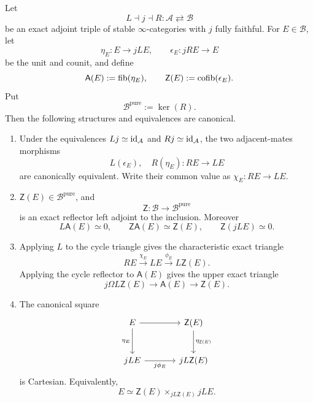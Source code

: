 \begin{theorem}
\label{thm:exact-adjoint-fracture}
Let
\[
    L\dashv j\dashv R:
    \mathcal A\rightleftarrows\mathcal B
\]
be an exact adjoint triple of stable \(\infty\)-categories with \(j\) fully
faithful. For \(E\in\mathcal B\), let
\[
    \eta_E:E\longrightarrow jLE,
    \qquad
    \epsilon_E:jRE\longrightarrow E
\]
be the unit and counit, and define
\[
    \mathsf A(E):=\operatorname{fib}(\eta_E),
    \qquad
    \mathsf Z(E):=\operatorname{cofib}(\epsilon_E).
\]
Put
\[
    \mathcal B^{\mathrm{pure}}:=\ker(R).
\]
Then the following structures and equivalences are canonical.
\begin{enumerate}[label=(\roman*)]
    \item Under the equivalences \(Lj\simeq\operatorname{id}_{\mathcal A}\) and
    \(Rj\simeq\operatorname{id}_{\mathcal A}\), the two adjacent-mates morphisms
    \[
        L(\epsilon_E),\quad R(\eta_E):RE\longrightarrow LE
    \]
    are canonically equivalent. Write their common value as
    \(\chi_E:RE\to LE\).

    \item \(\mathsf Z(E)\in\mathcal B^{\mathrm{pure}}\), and
    \[
        \mathsf Z:\mathcal B\longrightarrow\mathcal B^{\mathrm{pure}}
    \]
    is an exact reflector left adjoint to the inclusion. Moreover
    \[
        L\mathsf A(E)\simeq0,
        \qquad
        \mathsf Z\mathsf A(E)\simeq\mathsf Z(E),
        \qquad
        \mathsf Z(jLE)\simeq0.
    \]

    \item Applying \(L\) to the cycle triangle gives the characteristic exact
    triangle
    \[
        RE\xrightarrow{\chi_E}LE
        \xrightarrow{\phi_E}L\mathsf Z(E).
    \]
    Applying the cycle reflector to \(\mathsf A(E)\) gives the upper exact
    triangle
    \[
        j\Omega L\mathsf Z(E)
        \longrightarrow
        \mathsf A(E)
        \longrightarrow
        \mathsf Z(E).
    \]

    \item The canonical square
    \[
    \begin{tikzcd}[column sep=large,row sep=large]
        E \arrow[r] \arrow[d,"\eta_E"']
            & \mathsf Z(E) \arrow[d,"\eta_{\mathsf Z(E)}"]
        \\
        jLE \arrow[r,"j\phi_E"']
            & jL\mathsf Z(E)
    \end{tikzcd}
    \]
    is Cartesian. Equivalently,
    \[
        E\simeq
        \mathsf Z(E)\times_{jL\mathsf Z(E)}jLE.
    \]


\end{enumerate}
\end{theorem}
